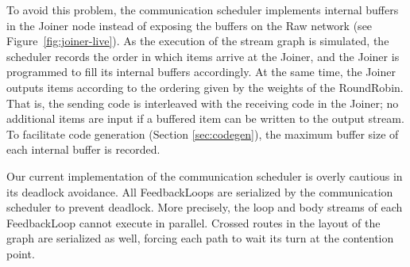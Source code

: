 To avoid this problem, the communication scheduler implements internal
buffers in the Joiner node instead of exposing the buffers on the Raw
network (see Figure~\ref{fig:joiner-live}).  As the execution of the
stream graph is simulated, the scheduler records the order in which
items arrive at the Joiner, and the Joiner is programmed to fill its
internal buffers accordingly.  At the same time, the Joiner outputs
items according to the ordering given by the weights of the
RoundRobin.  That is, the sending code is interleaved with the
receiving code in the Joiner; no additional items are input if a
buffered item can be written to the output stream.  To facilitate code
generation (Section \ref{sec:codegen}), the maximum buffer size of
each internal buffer is recorded.

Our current implementation of the communication scheduler is overly
cautious in its deadlock avoidance.  All FeedbackLoops are serialized
by the communication scheduler to prevent deadlock.  More precisely,
the loop and body streams of each FeedbackLoop cannot execute in
parallel.  Crossed routes in the layout of the graph are serialized as
well, forcing each path to wait its turn at the contention point.
